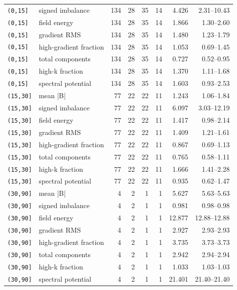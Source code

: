 \begin{longtable}{p{}p{}rrrrrr}
\texttt{(0,15]} & signed imbalance & 134 & 28 & 35 & 14 & 4.426 & 2.31--10.43\\
\texttt{(0,15]} & field energy & 134 & 28 & 35 & 14 & 1.866 & 1.30--2.60\\
\texttt{(0,15]} & gradient RMS & 134 & 28 & 35 & 14 & 1.480 & 1.23--1.79\\
\texttt{(0,15]} & high-gradient fraction & 134 & 28 & 35 & 14 & 1.053 & 0.69--1.45\\
\texttt{(0,15]} & total components & 134 & 28 & 35 & 14 & 0.727 & 0.52--0.95\\
\texttt{(0,15]} & high-k fraction & 134 & 28 & 35 & 14 & 1.370 & 1.11--1.68\\
\texttt{(0,15]} & spectral potential & 134 & 28 & 35 & 14 & 1.603 & 0.93--2.53\\
\texttt{(15,30]} & mean |B| & 77 & 22 & 22 & 11 & 1.243 & 1.06--1.84\\
\texttt{(15,30]} & signed imbalance & 77 & 22 & 22 & 11 & 6.097 & 3.03--12.19\\
\texttt{(15,30]} & field energy & 77 & 22 & 22 & 11 & 1.417 & 0.98--2.14\\
\texttt{(15,30]} & gradient RMS & 77 & 22 & 22 & 11 & 1.409 & 1.21--1.61\\
\texttt{(15,30]} & high-gradient fraction & 77 & 22 & 22 & 11 & 0.867 & 0.69--1.13\\
\texttt{(15,30]} & total components & 77 & 22 & 22 & 11 & 0.765 & 0.58--1.11\\
\texttt{(15,30]} & high-k fraction & 77 & 22 & 22 & 11 & 1.666 & 1.41--2.28\\
\texttt{(15,30]} & spectral potential & 77 & 22 & 22 & 11 & 0.935 & 0.62--1.47\\
\texttt{(30,90]} & mean |B| & 4 & 2 & 1 & 1 & 5.627 & 5.63--5.63\\
\texttt{(30,90]} & signed imbalance & 4 & 2 & 1 & 1 & 0.981 & 0.98--0.98\\
\texttt{(30,90]} & field energy & 4 & 2 & 1 & 1 & 12.877 & 12.88--12.88\\
\texttt{(30,90]} & gradient RMS & 4 & 2 & 1 & 1 & 2.927 & 2.93--2.93\\
\texttt{(30,90]} & high-gradient fraction & 4 & 2 & 1 & 1 & 3.735 & 3.73--3.73\\
\texttt{(30,90]} & total components & 4 & 2 & 1 & 1 & 2.942 & 2.94--2.94\\
\texttt{(30,90]} & high-k fraction & 4 & 2 & 1 & 1 & 1.033 & 1.03--1.03\\
\texttt{(30,90]} & spectral potential & 4 & 2 & 1 & 1 & 21.401 & 21.40--21.40\\
\bottomrule
\end{longtable}
\normalsize
\setlength{\tabcolsep}{6pt}
